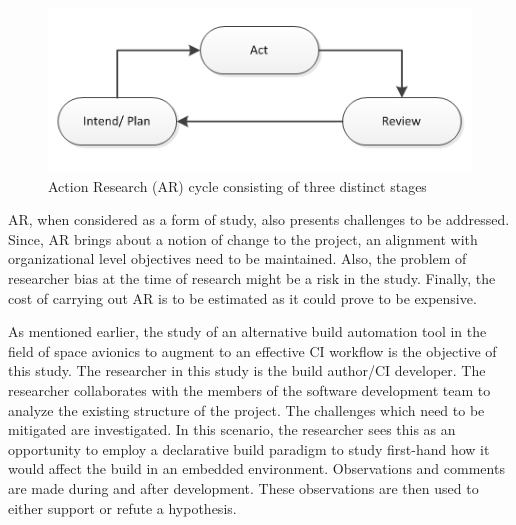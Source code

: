 \documentclass[12pt, a4paper, titlepage]{scrartcl}
\begin{document}
\begin{figure}[!ht]
\centering
\includegraphics[scale=0.99]{AR.png}
\caption{Action Research (AR) cycle consisting of three distinct stages}
\label{fig:ar-cycle}
\end{figure}

\par AR, when considered as a form of study, also presents challenges to be addressed. Since, AR brings about a notion of change to the project, an alignment with organizational level objectives need to be maintained. Also, the problem of researcher bias at the time of research might be a risk in the study. Finally, the cost of carrying out AR is to be estimated as it could prove to be expensive\cite{easterbrook2008selecting}. 
\par As mentioned earlier, the study of an alternative build automation tool in the field of space avionics to augment to an effective CI workflow is the objective of this study. The researcher in this study is the build author/CI developer. The researcher collaborates with the  members of the software development team to analyze the existing structure of the project. The challenges which need to be mitigated are investigated. In this scenario, the researcher sees this as an opportunity to employ a declarative build paradigm to study first-hand how it would affect the build in an embedded environment. Observations and comments are made during and after development. These observations are then used to either support or refute a hypothesis. 
\end{document}

